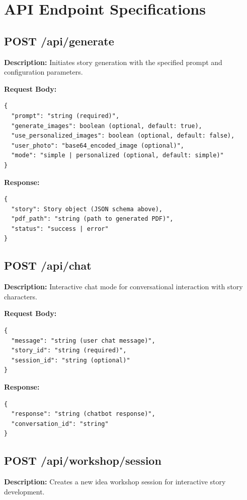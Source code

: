 \section{API Endpoint Specifications}

\subsection{POST /api/generate}

\textbf{Description:} Initiates story generation with the specified prompt and configuration parameters.

\textbf{Request Body:}
\begin{verbatim}
{
  "prompt": "string (required)",
  "generate_images": boolean (optional, default: true),
  "use_personalized_images": boolean (optional, default: false),
  "user_photo": "base64_encoded_image (optional)",
  "mode": "simple | personalized (optional, default: simple)"
}
\end{verbatim}

\textbf{Response:}
\begin{verbatim}
{
  "story": Story object (JSON schema above),
  "pdf_path": "string (path to generated PDF)",
  "status": "success | error"
}
\end{verbatim}

\subsection{POST /api/chat}

\textbf{Description:} Interactive chat mode for conversational interaction with story characters.

\textbf{Request Body:}
\begin{verbatim}
{
  "message": "string (user chat message)",
  "story_id": "string (required)",
  "session_id": "string (optional)"
}
\end{verbatim}

\textbf{Response:}
\begin{verbatim}
{
  "response": "string (chatbot response)",
  "conversation_id": "string"
}
\end{verbatim}

\subsection{POST /api/workshop/session}

\textbf{Description:} Creates a new idea workshop session for interactive story development.

